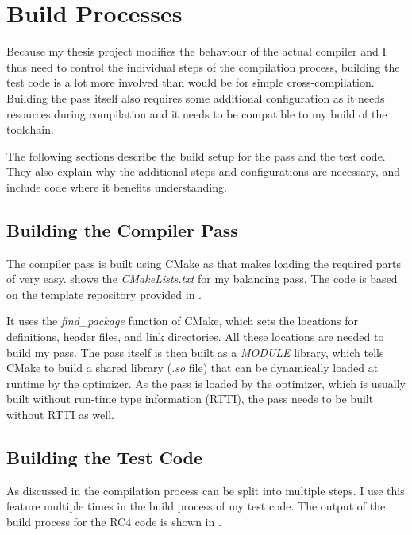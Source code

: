 \section{Build Processes}
\label{build}
Because my thesis project modifies the behaviour of the actual compiler and I thus need to control the individual steps of the compilation process, building the test code is a lot more involved than would be for simple cross-compilation.
Building the pass itself also requires some additional configuration as it needs \llvm{} resources during compilation and it needs to be compatible to my build of the \llvm{} toolchain.

The following sections describe the build setup for the pass and the test code.
They also explain why the additional steps and configurations are necessary, and include code where it benefits understanding.

\subsection{Building the Compiler Pass}
\label{buildpass}
The compiler pass is built using CMake as that makes loading the required parts of \llvm{} very easy.
 shows the \emph{CMakeLists.txt} for my balancing pass.
The code is based on the template repository provided in \cite{sampson2015llvm}.



It uses the \emph{find\_package} function of CMake, which sets the locations for definitions, header files, and link directories.
All these locations are needed to build my pass.
The pass itself is then built as a \emph{MODULE} library, which tells CMake to build a shared library (\emph{.so} file) that can be dynamically loaded at runtime by the optimizer.
As the pass is loaded by the optimizer, which is usually built without run-time type information (RTTI), the pass needs to be built without RTTI as well.

\subsection{Building the Test Code}
As discussed in  the \llvm{} compilation process can be split into multiple steps.
I use this feature multiple times in the build process of my test code.
The output of the build process for the RC4 code is shown in .

